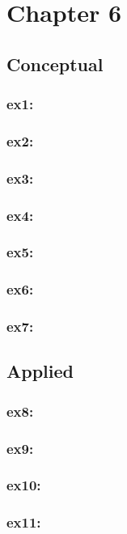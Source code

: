 \documentclass[a4paper,12pt,titlepage]{article} %
\begin{document}
\newpage
\section{Chapter 6}
\subsection{Conceptual}
\subsubsection{ex1:}
\subsubsection{ex2:}
\subsubsection{ex3:}
\subsubsection{ex4:}
\subsubsection{ex5:}
\subsubsection{ex6:}
\subsubsection{ex7:}

\subsection{Applied}
\subsubsection{ex8:}
\subsubsection{ex9:}
\subsubsection{ex10:}
\subsubsection{ex11:}

\newpage
\listoftables

\newpage
\listoffigures

\end{document}
